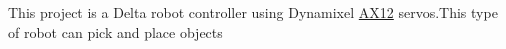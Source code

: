 This project is a Delta robot controller using Dynamixel \hyperlink{class_a_x12}{A\+X12} servos.\+This type of robot can pick and place objects 